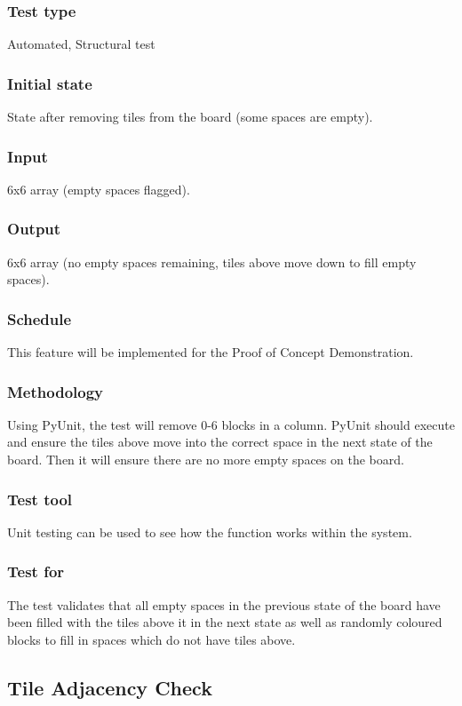 \documentclass[12pt]{article}
\begin{document}
\subsubsection{Test type}
Automated, Structural test
\subsubsection{Initial state}
State after removing tiles from the board (some spaces are empty). 
\subsubsection{Input}
6x6 array (empty spaces flagged).
\subsubsection{Output}
6x6 array (no empty spaces remaining, tiles above move down to fill empty spaces).
\subsubsection{Schedule}
This feature will be implemented for the Proof of Concept Demonstration.
\subsubsection{Methodology}
Using PyUnit, the test will remove 0-6 blocks in a column. PyUnit should execute and ensure the tiles above move into the correct space in the next state of the board. Then it will ensure there are no more empty spaces on the board.
\subsubsection{Test tool}
Unit testing can be used to see how the function works within the system.
\subsubsection{Test for}
The test validates that all empty spaces in the previous state of the board have been filled with the tiles above it in the next state as well as randomly coloured blocks to fill in spaces which do not have tiles above.

\newpage

\subsection{Tile Adjacency Check}
\end{document}
